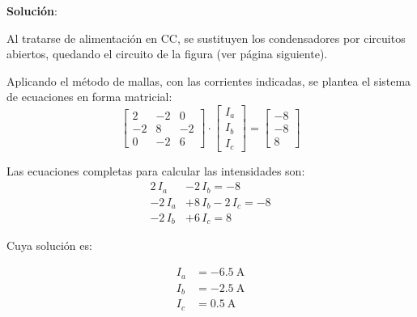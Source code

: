 \documentclass[10pt]{article}
\begin{document}
\vspace{3mm}

\hrulefill

\vspace{5mm}
\textbf{Solución}:
\vspace{4mm}

Al tratarse de alimentación en CC, se sustituyen los condensadores por circuitos abiertos, quedando el circuito de la figura (ver página siguiente).

\vspace{7mm}
Aplicando el método de mallas, con las corrientes indicadas, se plantea el sistema de ecuaciones en forma matricial:
\begin{equation*}
  \begin{bmatrix}
    2 & -2 & 0 \\
    -2 & 8 & -2 \\
    0 & -2 & 6
  \end{bmatrix} \cdot
  \begin{bmatrix}
    I_a\\
    I_b\\
    I_c
  \end{bmatrix} = %
  \begin{bmatrix}
    -8 \\
    -8\\
    8
  \end{bmatrix}
\end{equation*}

\vspace{2mm}
Las ecuaciones completas para calcular las intensidades son:
\begin{align*}
  2\,I_a&-2\,I_b = -8\\
  -2\,I_a&+8\,I_b-2\,I_c = -8\\
  -2\,I_b&+ 6\,I_c = 8
\end{align*}

\newpage

Cuya solución es:

\vspace{-8mm}
\begin{align*}
  I_a&=\qty{-6.5}{\ampere}\\
  I_b&=\qty{-2.5}{\ampere}\\
  I_c&=\qty{0.5}{\ampere}\\
\end{align*}
\end{document}
